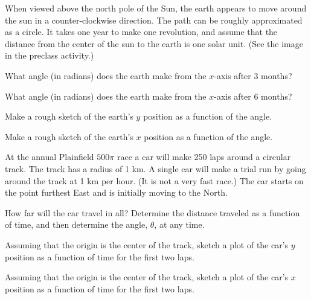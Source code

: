 \begin{problem}
\item When viewed above the north pole of the Sun, the earth appears
  to move around the sun in a counter-clockwise direction. The path
  can be roughly approximated as a circle. It takes
  one year to make one revolution, and assume that the distance from
  the center of the sun to the earth is one solar unit. (See the image
  in the preclass activity.)
  \begin{subproblem}
    \item What angle (in radians) does the earth make from the $x$-axis after 3
      months?
    \item What angle (in radians) does the earth make from the $x$-axis after 6
      months?
    \item Make a rough sketch of the earth's $y$ position as a
      function of the angle.
      \scalebox{0.5}{}

    \item Make a rough sketch of the earth's $x$ position as a
      function of the angle.
      \scalebox{0.5}{}

  \end{subproblem}

  \clearpage

\item At the annual Plainfield $500\pi$ race a car will make 250 laps
  around a circular track. The track has a radius of 1 km. A single
  car will make a trial run by going around the track at 1 km per
  hour. (It is not a very fast race.) The car starts on the point
  furthest East and is initially moving to the North.

      \scalebox{0.5}{}


  \begin{subproblem}
  \item How far will the car travel in all? Determine the distance
    traveled as a function of time, and then determine the angle,
    $\theta$, at any time.
    \vfill
  \item Assuming that the origin is the center of the track, sketch a
    plot of the car's $y$ position as a function of time for the
    first two laps.
    \vfill
  \item Assuming that the origin is the center of the track, sketch a
    plot of the car's $x$ position as a function of time for the
    first two laps.
    \vfill
  \end{subproblem}
\end{problem}

